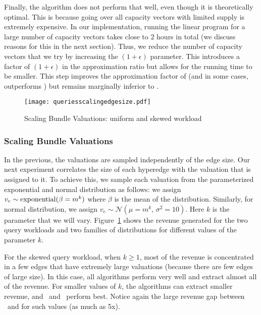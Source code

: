 Finally, the \cip algorithm does not perform that well, even though it is theoretically optimal. This is because going over all capacity vectors with limited supply is extremely expensive. In our implementation, running the linear program for a large number of capacity vectors takes close to $2$ hours in total (we discuss reasons for this in the next section).  Thus, we reduce the number of capacity vectors that we try by increasing the $(1+\epsilon)$ parameter. This introduces a factor of $(1+\epsilon)$ in the approximation ratio but allows for the running time to be smaller. This step improves the approximation factor of \cip (and in some cases, outperforms \lpip) but remains marginally inferior to \lpip. 





\begin{figure}[!t]
	\centering
	\texttt{[image: queriesscalingedgesize.pdf]}
	\caption{Scaling Bundle Valuations: uniform and skewed workload} \label{fig:scalingedge}
\end{figure}  

\subsubsection{Scaling Bundle Valuations} In the previous, the valuations are sampled independently of the edge size. Our next experiment correlates the size of each hyperedge with the valuation that is assigned to it. 
To achieve this, we sample each valuation from the parameterized exponential and normal distribution as follows: we assign $v_e \sim {\rm exponential} (\beta = m^k)$ where $\beta$ is the mean of the distribution. Similarly, for normal distribution, we assign $v_e \sim \mathcal{N}(\mu = m^k,\, \sigma^2 = 10)$. Here $k$ is the parameter that we will vary. Figure~\ref{fig:scalingedge} shows the revenue
generated for the two query workloads and two families of distributions for 
different values of the parameter $k$. 

For the skewed query workload, when $k \geq 1$, most of the revenue is concentrated in a few edges that have extremely large valuations (because there are few edges of large size). In this case, all
algorithms perform very well and extract almost all of the revenue. For smaller values of $k$, the algorithms can extract smaller revenue, and \lpip\ and \cip\ perform best. Notice again the large revenue gap between \lpip\ and \uip for such values (as much as 5x).

